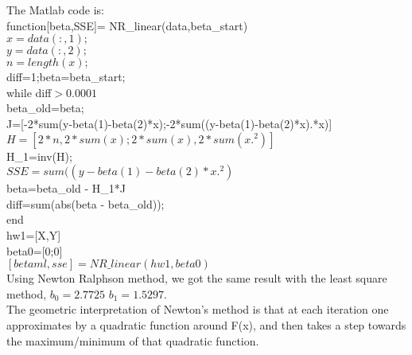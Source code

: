 \documentclass[12pt]{article}
\begin{document}
{The Matlab code is:\\
function[beta,SSE]= NR\_linear(data,beta\_start)\\
$x=data(:,1);$\\
$y=data(:,2);$\\
$n=length(x);$\\
diff=1;beta=beta\_start;\\
while diff$> 0.0001$\\
   beta\_old=beta;\\
    J=[-2*sum(y-beta(1)-beta(2)*x);-2*sum((y-beta(1)-beta(2)*x).*x)]\\     
   $ H=[2*n, 2*sum(x); 2*sum(x), 2*sum(x.^2)]$\\
    H\_1=inv(H);\\
   $SSE=sum((y-beta(1)-beta(2)*x.^2)$\\
   beta=beta\_old - H\_1*J\\
    diff=sum(abs(beta - beta\_old));\\
end\\
hw1=[X,Y]\\
beta0=[0;0]\\
$[betaml,sse] = NR\_linear(hw1,beta0)$\\
Using Newton Ralphson method, we got the same result with the least square method, $b_0=2.7725$ $b_1=1.5297.$\\
The geometric interpretation of Newton's method is that at each iteration one approximates  by a quadratic function around F(x), and then takes a step towards the maximum/minimum of that quadratic function.
}
\end{document}
